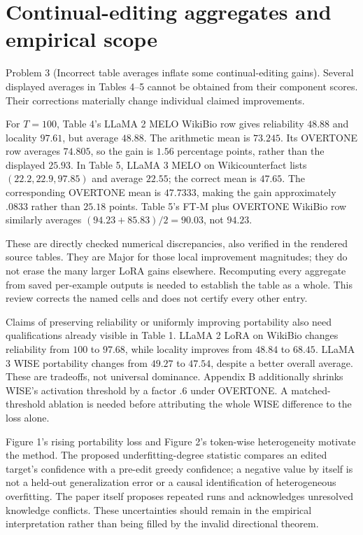\documentclass[10pt]{article}
\begin{document}
\section*{Continual-editing aggregates and empirical scope}
Problem 3 (Incorrect table averages inflate some continual-editing gains).  Several displayed averages in Tables 4–5 cannot be obtained from their component scores. Their corrections materially change individual claimed improvements.\par
For \(T=100\), Table 4’s LLaMA 2 MELO WikiBio row gives reliability \(48.88\) and locality \(97.61\), but average \(48.88\). The arithmetic mean is \(73.245\). Its OVERTONE row averages \(74.805\), so the gain is \(1.56\) percentage points, rather than the displayed \(25.93\). In Table 5, LLaMA 3 MELO on Wikicounterfact lists \((22.2,22.9,97.85)\) and average \(22.55\); the correct mean is \(47.65\). The corresponding OVERTONE mean is \(47.7333\), making the gain approximately \(.0833\) rather than \(25.18\) points. Table 5’s FT-M plus OVERTONE WikiBio row similarly averages \((94.23+85.83)/2=90.03\), not \(94.23\).\par
These are directly checked numerical discrepancies, also verified in the rendered source tables. They are Major for those local improvement magnitudes; they do not erase the many larger LoRA gains elsewhere. Recomputing every aggregate from saved per-example outputs is needed to establish the table as a whole. This review corrects the named cells and does not certify every other entry.\par
Claims of preserving reliability or uniformly improving portability also need qualifications already visible in Table 1. LLaMA 2 LoRA on WikiBio changes reliability from \(100\) to \(97.68\), while locality improves from \(48.84\) to \(68.45\). LLaMA 3 WISE portability changes from \(49.27\) to \(47.54\), despite a better overall average. These are tradeoffs, not universal dominance. Appendix B additionally shrinks WISE’s activation threshold by a factor \(.6\) under OVERTONE. A matched-threshold ablation is needed before attributing the whole WISE difference to the loss alone.\par
Figure 1’s rising portability loss and Figure 2’s token-wise heterogeneity motivate the method. The proposed underfitting-degree statistic compares an edited target’s confidence with a pre-edit greedy confidence; a negative value by itself is not a held-out generalization error or a causal identification of heterogeneous overfitting. The paper itself proposes repeated runs and acknowledges unresolved knowledge conflicts. These uncertainties should remain in the empirical interpretation rather than being filled by the invalid directional theorem.\par
\end{document}
